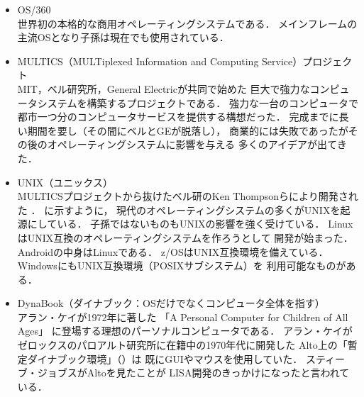 \begin{itemize}
\item OS/360 \\
  世界初の本格的な商用オペレーティングシステムである．
  メインフレームの主流OSとなり子孫は現在でも使用されている\cite{os360}．

\item MULTICS（MULTiplexed Information and Computing Service）プロジェクト
  \cite{third} \\
  MIT，ベル研究所，General Electricが共同で始めた
  巨大で強力なコンピュータシステムを構築するプロジェクトである．
  強力な一台のコンピュータで
  都市一つ分のコンピュータサービスを提供する構想だった．
  完成までに長い期間を要し（その間にベルとGEが脱落し），
  商業的には失敗であったがその後のオペレーティングシステムに影響を与える
  多くのアイデアが出てきた．

\item UNIX（ユニックス） \\
  MULTICSプロジェクトから抜けたベル研のKen Thompsonらにより開発された
  \cite{unix}．
  に示すように，
  現代のオペレーティングシステムの多くがUNIXを起源にしている．
  子孫ではないものもUNIXの影響を強く受けている．
  LinuxはUNIX互換のオペレーティングシステムを作ろうとして
  開発が始まった\cite{linux}．
  Androidの中身はLinuxである\cite{android}．
  z/OSはUNIX互換環境を備えている\cite{zos}．
  WindowsにもUNIX互換環境（POSIXサブシステム）を
  利用可能なものがある\cite{windows}．

\item DynaBook（ダイナブック：OSだけでなくコンピュータ全体を指す）
  \cite{dynabook2} \\
  アラン・ケイが1972年に著した
  「A Personal Computer for Children of All Ages」\cite{key72, key72J}
  に登場する理想のパーソナルコンピュータである．
  アラン・ケイがゼロックスのパロアルト研究所に在籍中の1970年代に開発した
  Alto上の「暫定ダイナブック環境」（）は
  既にGUIやマウスを使用していた．
  スティーブ・ジョブスがAltoを見たことが
  LISA開発のきっかけになったと言われている\cite{dynabook}．


\end{itemize}

